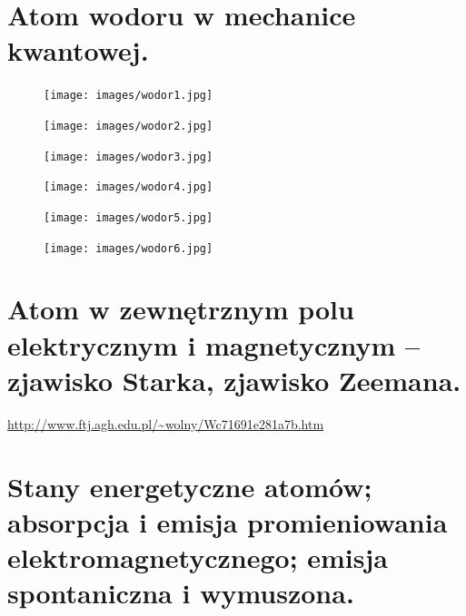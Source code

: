 \documentclass{article}
\begin{document}
\section{Atom wodoru w mechanice kwantowej.}
\begin{figure}[H]
    \centering
    \texttt{[image: images/wodor1.jpg]}
\end{figure}
\begin{figure}[H]
    \centering
    \texttt{[image: images/wodor2.jpg]}
\end{figure}
\begin{figure}[H]
    \centering
    \texttt{[image: images/wodor3.jpg]}
\end{figure}
\begin{figure}[H]
    \centering
    \texttt{[image: images/wodor4.jpg]}
\end{figure}
\begin{figure}[H]
    \centering
    \texttt{[image: images/wodor5.jpg]}
\end{figure}
\begin{figure}[H]
    \centering
    \texttt{[image: images/wodor6.jpg]}
\end{figure}

\section{Atom w zewnętrznym polu elektrycznym i magnetycznym – zjawisko Starka, zjawisko Zeemana.}

\url{http://www.ftj.agh.edu.pl/~wolny/Wc71691e281a7b.htm}

\section{Stany energetyczne atomów; absorpcja i emisja promieniowania elektromagnetycznego; emisja spontaniczna i wymuszona.}
\end{document}
